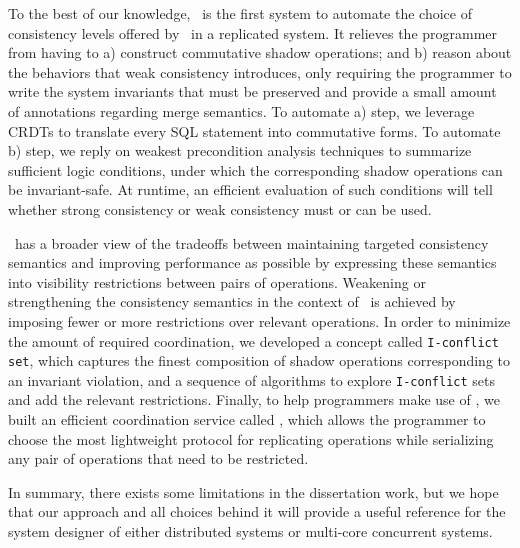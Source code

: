 To the best of our knowledge, \tool\ is the first system to automate the
choice of consistency levels offered by \RBCN\ in a replicated system. 
It relieves the programmer from having to a) construct commutative shadow operations;
and b) reason about the behaviors that weak consistency introduces, only requiring the
programmer to write the system invariants that must be preserved
and provide a small amount of annotations regarding merge semantics. To automate
a) step, we leverage CRDTs to translate every SQL statement into commutative forms. 
To automate b) step, we reply on weakest precondition analysis
techniques to summarize sufficient logic conditions, under which the corresponding shadow operations
can be invariant-safe. At runtime, an efficient evaluation of such conditions will
tell whether strong consistency or weak consistency must or can be used.

\PRCN\ has a broader view of the tradeoffs between maintaining targeted consistency semantics and
improving performance as possible by expressing these semantics into visibility restrictions
between pairs of operations. Weakening or strengthening the consistency semantics in the
context of \PRCN\ is achieved by imposing fewer or
more restrictions over relevant operations. In order to minimize the amount of required coordination,
we developed a concept called {\tt I-conflict set}, which captures the finest composition of
shadow operations corresponding to an invariant violation, and  a sequence of algorithms to explore
{\tt I-conflict} sets and add the relevant restrictions. Finally, to help programmers make use of
\PRCN, we built an efficient coordination service called \coordtool, which allows the programmer
to choose the most lightweight protocol for replicating operations while serializing
any pair of operations that need to be restricted.

In summary, there exists some limitations in the dissertation work, but we hope that our approach 
and all choices behind it will provide a useful reference for the system designer of either distributed
systems or multi-core concurrent systems.
